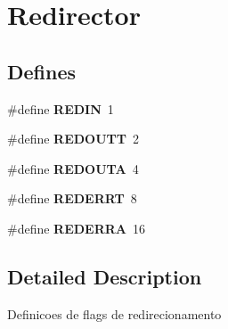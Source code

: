 \hypertarget{group__Redirector}{
\section{Redirector}
\label{group__Redirector}
}
\subsection*{Defines}
\begin{DoxyCompactItemize}
\item 
\hypertarget{group__Redirector_ga1aaf8ba3f81489b54b91ef1051d30482}{
\#define {\bfseries REDIN}~1}
\label{group__Redirector_ga1aaf8ba3f81489b54b91ef1051d30482}

\item 
\hypertarget{group__Redirector_gabf10b0d1be2fd7b17349a6e0def9e403}{
\#define {\bfseries REDOUTT}~2}
\label{group__Redirector_gabf10b0d1be2fd7b17349a6e0def9e403}

\item 
\hypertarget{group__Redirector_ga43b4c98ae5dbf234ac8a57878ad269bc}{
\#define {\bfseries REDOUTA}~4}
\label{group__Redirector_ga43b4c98ae5dbf234ac8a57878ad269bc}

\item 
\hypertarget{group__Redirector_gaaeb0e4945b8a553f236251d56cbc9728}{
\#define {\bfseries REDERRT}~8}
\label{group__Redirector_gaaeb0e4945b8a553f236251d56cbc9728}

\item 
\hypertarget{group__Redirector_ga5bfe677bba3f67ecf88dfb0d686a18e5}{
\#define {\bfseries REDERRA}~16}
\label{group__Redirector_ga5bfe677bba3f67ecf88dfb0d686a18e5}

\end{DoxyCompactItemize}


\subsection{Detailed Description}
Definicoes de flags de redirecionamento 
